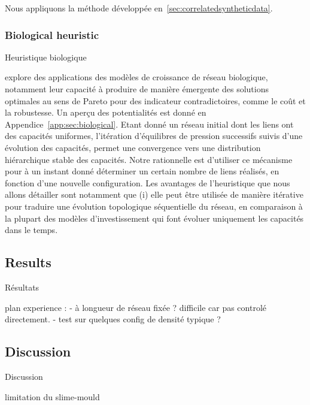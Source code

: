 Nous appliquons la méthode développée en~\ref{sec:correlatedsyntheticdata}.



\subsubsection{Biological heuristic}{Heuristique biologique}

\cite{raimbault2015labex} explore des applications des modèles de croissance de réseau biologique, notamment leur capacité à produire de manière émergente des solutions optimales au sens de Pareto pour des indicateur contradictoires, comme le coût et la robustesse. Un aperçu des potentialités est donné en Appendice~\ref{app:sec:biological}. Etant donné un réseau initial dont les liens ont des capacités uniformes, l'itération d'équilibres de pression successifs suivis d'une évolution des capacités, permet une convergence vers une distribution hiérarchique stable des capacités. Notre rationnelle est d'utiliser ce mécanisme pour à un instant donné déterminer un certain nombre de liens réalisés, en fonction d'une nouvelle configuration. Les avantages de l'heuristique que nous allons détailler sont notamment que (i) elle peut être utilisée de manière itérative pour traduire une évolution topologique séquentielle du réseau, en comparaison à la plupart des modèles d'investissement qui font évoluer uniquement les capacités dans le temps.






\subsection{Results}{Résultats}




plan experience :
 - à longueur de réseau fixée ? difficile car pas controlé directement.
 - test sur quelques config de densité typique ?




\subsection{Discussion}{Discussion}




limitation du slime-mould \cite{adamatzky2010road}




